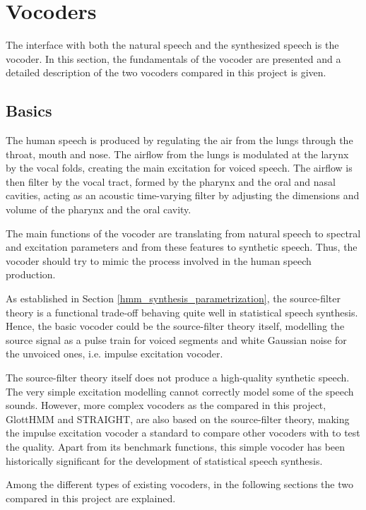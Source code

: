 \section{Vocoders}
\label{vocoders}
The interface with both the natural speech and the synthesized speech is the vocoder. 
%
In this section, the fundamentals of the vocoder are presented and a detailed description of the two vocoders compared in this project is given.

\subsection{Basics}
\label{vocoders_basics}
The human speech is produced by regulating the air from the lungs through the throat, mouth and nose. 
%
The airflow from the lungs is modulated at the larynx by the vocal folds, creating the main excitation for voiced speech. 
%
The airflow is then filter by the vocal tract, formed by the pharynx and the oral and nasal cavities, acting as an acoustic time-varying filter by adjusting the dimensions and volume of the pharynx and the oral cavity.

The main functions of the vocoder are translating from natural speech to spectral and excitation parameters and from these features to synthetic speech.
%
Thus, the vocoder should try to mimic the process involved in the human speech production.

As established in Section \ref{hmm_synthesis_parametrization}, the source-filter theory is a functional trade-off behaving quite well in statistical speech synthesis.
%
Hence, the basic vocoder could be the source-filter theory itself, modelling the source signal as a pulse train for voiced segments and white Gaussian noise for the unvoiced ones, i.e. impulse excitation vocoder.

The source-filter theory itself does not produce a high-quality synthetic speech.
%
The very simple excitation modelling cannot correctly model some of the speech sounds.
%
However, more complex vocoders as the compared in this project, GlottHMM and STRAIGHT, are also based on the source-filter theory, making the impulse excitation vocoder a standard to compare other vocoders with to test the quality.
%
Apart from its benchmark functions, this simple vocoder has been historically significant for the development of statistical speech synthesis.

Among the different types of existing vocoders, in the following sections the two compared in this project are explained.


